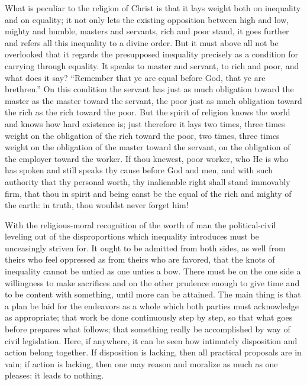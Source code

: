 \documentclass[12pt,a4paper,openany]{book}
\newcommand{\opage}[1]{\marginnote{\footnotesize\textit{[#1]}}}
\begin{document}
What is peculiar to the religion of Christ is that
it lays weight both on inequality and on equality;
it not only lets the existing opposition between
high and low, mighty and humble, masters and servants,
rich and poor stand, it goes further and refers
all this inequality to a divine order. But it
must above all not be overlooked that it regards
the presupposed inequality precisely as a condition for carrying through
equality. It speaks to master and servant, to
rich and poor, and what does it say? ``Remember that
ye are equal before God, that ye are brethren.'' On this condition
the servant has just as much obligation toward the master
as the master toward the servant, the poor just as much
obligation toward the rich as the rich toward the
poor. But the spirit of religion knows the world and knows
how hard existence is; just therefore it lays two
times, three times weight on the obligation of the rich
toward the poor, two times, three times weight on the obligation of the master
toward the servant, on the obligation of the employer
toward the worker. If thou knewest, poor worker,
who He is who has spoken and still speaks
thy cause before God and men, and with such
authority that thy personal worth, thy inalienable right
shall stand immovably firm, that thou in spirit and being canst
\setcounter{footnote}{0}%
\opage{150}be the equal of the rich and mighty of the earth: in truth,
thou wouldst never forget him!

With the religious-moral recognition of the worth of man
the political-civil leveling out of the disproportions
which inequality introduces must be unceasingly striven for.
It ought to be admitted from both sides, as well from theirs who
feel oppressed as from theirs who are favored,
that the knots of inequality cannot be untied
as one unties a bow. There must be on the one side
a willingness to make sacrifices and on the other
prudence enough to give time and to be content with
something, until more can be attained. The main thing is
that a plan be laid for the endeavors as a whole
which both parties must acknowledge as appropriate;
that work be done continuously step by
step, so that what goes before prepares what follows;
that something really be accomplished by way of civil legislation.
Here, if anywhere, it can be seen how intimately disposition and action
belong together. If disposition is lacking, then all practical
proposals are in vain; if action is lacking, then one
may reason and moralize as much as one pleases: it
leads to nothing.
\end{document}
